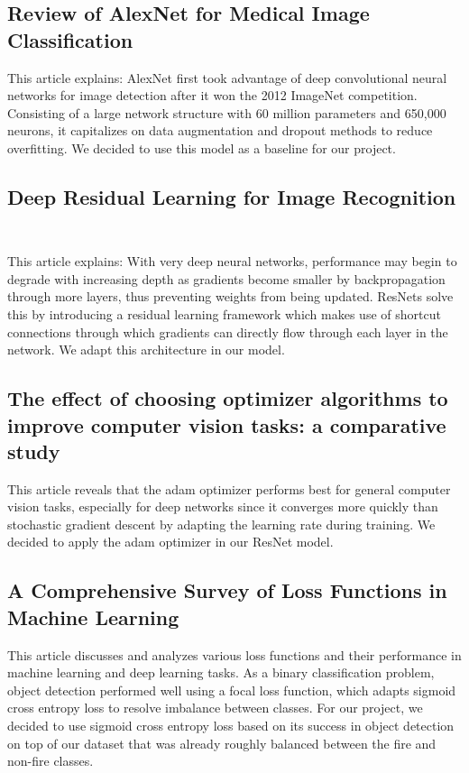 \subsection{Review of AlexNet for Medical Image Classification~\citep{tang2023review}}

This article explains: AlexNet first took advantage of deep convolutional neural networks for image detection after it won the 2012 ImageNet competition. Consisting of a large network structure with 60 million parameters and 650,000 neurons, it capitalizes on data augmentation and dropout methods to reduce overfitting. We decided to use this model as a baseline for our project.

\subsection{Deep Residual Learning for Image Recognition
	~\citep{he2015deep}}


This article explains: With very deep neural networks, performance may begin to degrade with increasing depth as gradients become smaller by backpropagation through more layers, thus preventing weights from being updated. ResNets solve this by introducing a residual learning framework which makes use of shortcut connections through which gradients can directly flow through each layer in the network. We adapt this architecture in our model.

\subsection{The effect of choosing optimizer algorithms to improve computer vision tasks: a comparative study~\citep{Hassan}}

This article reveals that the adam optimizer performs best for general computer vision tasks, especially for deep networks since it converges more quickly than stochastic gradient descent by adapting the learning rate during training. We decided to apply the adam optimizer in our ResNet model.

\subsection{A Comprehensive Survey of Loss Functions in Machine Learning~\citep{Wang2022}}

This article discusses and analyzes various loss functions and their performance in machine learning and deep learning tasks. As a binary classification problem, object detection performed well using a focal loss function, which adapts sigmoid cross entropy loss to resolve imbalance between classes. For our project, we decided to use sigmoid cross entropy loss based on its success in object detection on top of our dataset that was already roughly balanced between the fire and non-fire classes.

